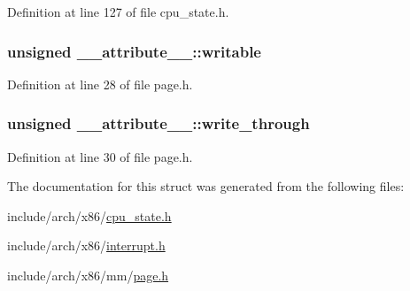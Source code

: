 \-Definition at line 127 of file cpu\-\_\-state.\-h.

\hypertarget{struct____attribute_____aa54f6106e9d41e64e8adc771d2dacd31}{
\subsubsection[{writable}]{\setlength{\rightskip}{0pt plus 5cm}unsigned {\bf \-\_\-\-\_\-attribute\-\_\-\-\_\-\-::writable}}}\label{struct____attribute_____aa54f6106e9d41e64e8adc771d2dacd31}


\-Definition at line 28 of file page.\-h.

\hypertarget{struct____attribute_____a0155c4462a7b1669120975fbe985a5dc}{
\subsubsection[{write\-\_\-through}]{\setlength{\rightskip}{0pt plus 5cm}unsigned {\bf \-\_\-\-\_\-attribute\-\_\-\-\_\-\-::write\-\_\-through}}}\label{struct____attribute_____a0155c4462a7b1669120975fbe985a5dc}


\-Definition at line 30 of file page.\-h.



\-The documentation for this struct was generated from the following files\-:\begin{DoxyCompactItemize}
\item 
include/arch/x86/\hyperlink{cpu__state_8h}{cpu\-\_\-state.\-h}\item 
include/arch/x86/\hyperlink{interrupt_8h}{interrupt.\-h}\item 
include/arch/x86/mm/\hyperlink{page_8h}{page.\-h}\end{DoxyCompactItemize}
